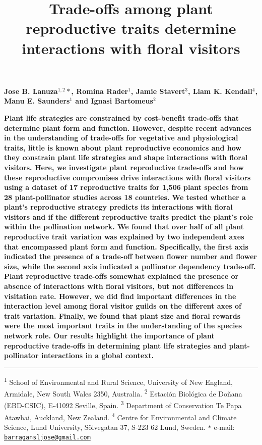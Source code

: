 \documentclass[
  12pt,
  a4paper,
]{article}
\title{\singlespacing \vspace{-1.5cm} \LARGE Trade-offs among plant reproductive traits determine interactions with floral visitors}
\author{}
\date{\vspace{-2.5em}}
\begin{document}
\maketitle

\vspace{-2.2cm}
\singlespacing
\large

\textbf{Jose B. Lanuza$^{1,2}*$, Romina Rader$^{1}$, Jamie Stavert$^{3}$, Liam K. Kendall$^{4}$, Manu E. Saunders$^{1}$ and Ignasi Bartomeus$^{2}$}

\normalsize

\textbf{Plant life strategies are constrained by cost-benefit trade-offs that determine plant form and function. However, despite recent advances in the understanding of trade-offs for vegetative and physiological traits, little is known about plant reproductive economics and how they constrain plant life strategies and shape interactions with floral visitors. Here, we investigate plant reproductive trade-offs and how these reproductive compromises drive interactions with floral visitors using a dataset of 17 reproductive traits for 1,506 plant species from 28 plant-pollinator studies across 18 countries. We tested whether a plant's reproductive strategy predicts its interactions with floral visitors and if the different reproductive traits predict the plant's role within the pollination network. We found that over half of all plant reproductive trait variation was explained by two independent axes that encompassed plant form and function. Specifically, the first axis indicated the presence of a trade-off between flower number and flower size, while the second axis indicated a pollinator dependency trade-off. Plant reproductive trade-offs somewhat explained the presence or absence of interactions with floral visitors, but not differences in visitation rate. However, we did find important differences in the interaction level among floral visitor guilds on the different axes of trait variation. Finally, we found that plant size and floral rewards were the most important traits in the understanding of the species network role. Our results highlight the importance of plant reproductive trade-offs in determining plant life strategies and plant-pollinator interactions in a global context.}

\small
\vspace{-0.5cm}

\noindent

\rule{\textwidth}{1pt}

\textsuperscript{1} School of Environmental and Rural Science, University of New England, Armidale, New South Wales 2350, Australia. \textsuperscript{2} Estación Biológica de Doñana (EBD-CSIC), E-41092 Seville, Spain. \textsuperscript{3} Department of Conservation \textbar{} Te Papa Atawhai, Auckland, New Zealand. \textsuperscript{4} Centre for Environmental and Climate Science, Lund University, Sölvegatan 37, S-223 62 Lund, Sweden. \texttt{*} e-mail: \href{mailto:barragansljose@gmail.com}{\nolinkurl{barragansljose@gmail.com}}
\end{document}
